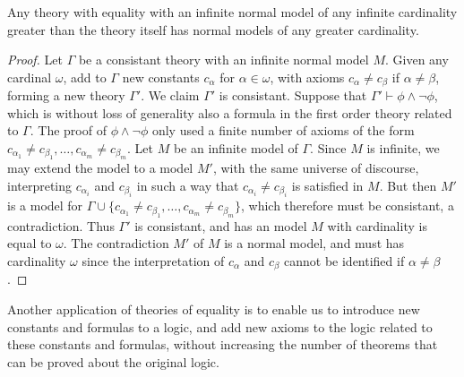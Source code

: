 \begin{corollary}
    Any theory with equality with an infinite normal model of any infinite cardinality greater than the theory itself has normal models of any greater cardinality.
\end{corollary}
\begin{proof}
    Let $\Gamma$ be a consistant theory with an infinite normal model $M$. Given any cardinal $\omega$, add to $\Gamma$ new constants $c_\alpha$ for $\alpha \in \omega$, with axioms $c_\alpha \neq c_\beta$ if $\alpha \neq \beta$, forming a new theory $\Gamma'$. We claim $\Gamma'$ is consistant. Suppose that $\Gamma' \vdash \phi \wedge \neg \phi$, which is without loss of generality also a formula in the first order theory related to $\Gamma$. The proof of $\phi \wedge \neg \phi$ only used a finite number of axioms of the form $c_{\alpha_1} \neq c_{\beta_1}, \dots, c_{\alpha_m} \neq c_{\beta_m}$. Let $M$ be an infinite model of $\Gamma$. Since $M$ is infinite, we may extend the model to a model $M'$, with the same universe of discourse, interpreting $c_{\alpha_i}$ and $c_{\beta_i}$ in such a way that $c_{\alpha_i} \neq c_{\beta_i}$ is satisfied in $M$. But then $M'$ is a model for $\Gamma \cup \{ c_{\alpha_1} \neq c_{\beta_1}, \dots, c_{\alpha_m} \neq c_{\beta_m} \}$, which therefore must be consistant, a contradiction. Thus $\Gamma'$ is consistant, and has an model $M$ with cardinality is equal to $\omega$. The contradiction $M'$ of $M$ is a normal model, and must has cardinality $\omega$ since the interpretation of $c_\alpha$ and $c_\beta$ cannot be identified if $\alpha \neq \beta$.
\end{proof}

Another application of theories of equality is to enable us to introduce new constants and formulas to a logic, and add new axioms to the logic related to these constants and formulas, without increasing the number of theorems that can be proved about the original logic.


